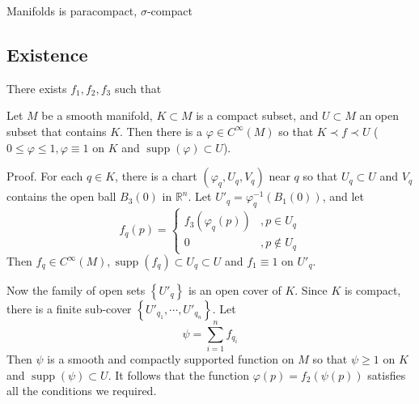 \documentclass[12pt, oneside]{book}
\begin{document}
\begin{corollary}
    Manifolds is paracompact, $\sigma$-compact
\end{corollary}




\subsection{Existence}
\begin{lemma}
    There exists $f_1,f_2, f_3$ such that
\end{lemma}

\begin{theorem}
    Let $M$ be a smooth manifold, $K \subset M$ is a compact subset, and $U \subset M$ an open subset that contains $K$.
    Then there is a $\varphi \in C^{\infty}(M)$ so that $K \prec f \prec U$ ($0 \leq \varphi \leq 1, \varphi \equiv 1$ on $K$ and $\operatorname{supp}(\varphi) \subset U$).

    Proof. For each $q \in K$, there is a chart $\left(\varphi_q, U_q, V_q\right)$ near $q$ so that $U_q \subset U$ and $V_q$ contains the open ball $B_3(0)$ in $\mathbb{R}^n$.
    Let $U'_q=\varphi_q^{-1}\left(B_1(0)\right)$, and let
    \begin{equation*}
        f_q(p)= \begin{cases}f_3\left(\varphi_q(p)\right) & , p \in U_q    \\
             0                            & , p \notin U_q\end{cases}
    \end{equation*}
    Then $f_q \in C^{\infty}(M), \operatorname{supp}\left(f_q\right) \subset U_q \subset U$ and $f_1 \equiv 1$ on ${U}'_q$.

    Now the family of open sets $\left\{U'_q\right\}$ is an open cover of $K$.
    Since $K$ is compact, there is a finite sub-cover $\left\{{U}'_{q_1}, \cdots, U'_{q_n}\right\}$. Let \begin{equation*}
        \psi=\sum_{i=1}^n f_{q_i}
    \end{equation*}
    Then $\psi$ is a smooth and compactly supported function on $M$ so that $\psi \geq 1$ on $K$ and $\operatorname{supp}(\psi) \subset U$.
    It follows that the function $\varphi(p)=f_2(\psi(p))$ satisfies all the conditions we required.
\end{theorem}
\end{document}
